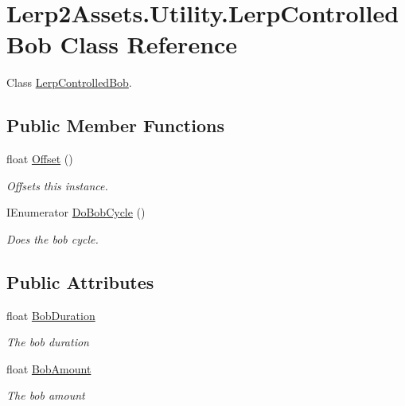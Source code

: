 \hypertarget{class_lerp2_assets_1_1_utility_1_1_lerp_controlled_bob}{}\section{Lerp2\+Assets.\+Utility.\+Lerp\+Controlled\+Bob Class Reference}
\label{class_lerp2_assets_1_1_utility_1_1_lerp_controlled_bob}


Class \hyperlink{class_lerp2_assets_1_1_utility_1_1_lerp_controlled_bob}{Lerp\+Controlled\+Bob}.  


\subsection*{Public Member Functions}
\begin{DoxyCompactItemize}
\item 
float \hyperlink{class_lerp2_assets_1_1_utility_1_1_lerp_controlled_bob_af7a7cda190032b42aa5491557d58aa8e}{Offset} ()
\begin{DoxyCompactList}\small\item\em Offsets this instance. \end{DoxyCompactList}\item 
I\+Enumerator \hyperlink{class_lerp2_assets_1_1_utility_1_1_lerp_controlled_bob_a792546615058f70d3fa49879c8286056}{Do\+Bob\+Cycle} ()
\begin{DoxyCompactList}\small\item\em Does the bob cycle. \end{DoxyCompactList}\end{DoxyCompactItemize}
\subsection*{Public Attributes}
\begin{DoxyCompactItemize}
\item 
float \hyperlink{class_lerp2_assets_1_1_utility_1_1_lerp_controlled_bob_aa2447de102a15b855e2535786638ee18}{Bob\+Duration}
\begin{DoxyCompactList}\small\item\em The bob duration \end{DoxyCompactList}\item 
float \hyperlink{class_lerp2_assets_1_1_utility_1_1_lerp_controlled_bob_aefcde9124b38328f41d1124317eec6b0}{Bob\+Amount}
\begin{DoxyCompactList}\small\item\em The bob amount \end{DoxyCompactList}\end{DoxyCompactItemize}


